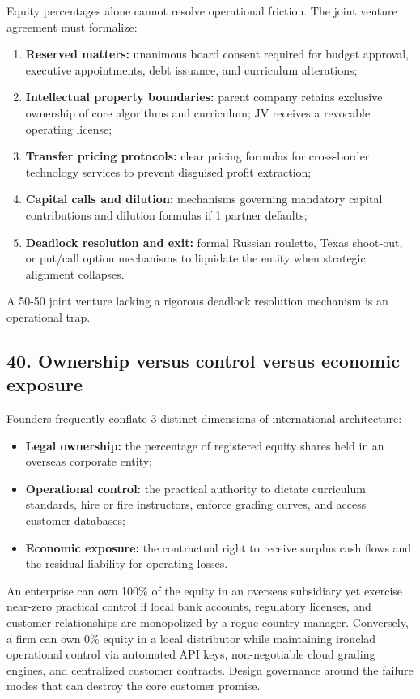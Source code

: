 Equity percentages alone cannot resolve operational friction. The joint venture agreement must formalize:
\begin{enumerate}
    \item \textbf{Reserved matters:} unanimous board consent required for budget approval, executive appointments, debt issuance, and curriculum alterations;
    \item \textbf{Intellectual property boundaries:} parent company retains exclusive ownership of core algorithms and curriculum; JV receives a revocable operating license;
    \item \textbf{Transfer pricing protocols:} clear pricing formulas for cross-border technology services to prevent disguised profit extraction;
    \item \textbf{Capital calls and dilution:} mechanisms governing mandatory capital contributions and dilution formulas if 1 partner defaults;
    \item \textbf{Deadlock resolution and exit:} formal Russian roulette, Texas shoot-out, or put/call option mechanisms to liquidate the entity when strategic alignment collapses.
\end{enumerate}
A 50-50 joint venture lacking a rigorous deadlock resolution mechanism is an operational trap.

\subsection{40. Ownership versus control versus economic exposure}

Founders frequently conflate 3 distinct dimensions of international architecture:
\begin{itemize}
    \item \textbf{Legal ownership:} the percentage of registered equity shares held in an overseas corporate entity;
    \item \textbf{Operational control:} the practical authority to dictate curriculum standards, hire or fire instructors, enforce grading curves, and access customer databases;
    \item \textbf{Economic exposure:} the contractual right to receive surplus cash flows and the residual liability for operating losses.
\end{itemize}

An enterprise can own 100\% of the equity in an overseas subsidiary yet exercise near-zero practical control if local bank accounts, regulatory licenses, and customer relationships are monopolized by a rogue country manager. Conversely, a firm can own 0\% equity in a local distributor while maintaining ironclad operational control via automated API keys, non-negotiable cloud grading engines, and centralized customer contracts. Design governance around the failure modes that can destroy the core customer promise.

